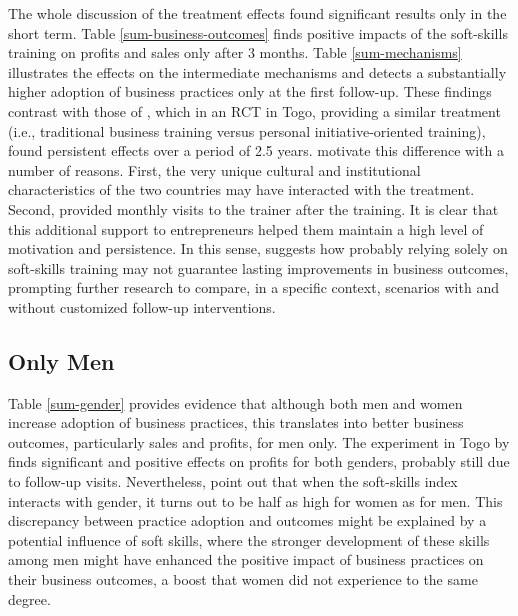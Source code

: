The whole discussion of the treatment effects found significant results only in the short term. Table \ref{sum-business-outcomes} finds positive impacts of the soft-skills training on profits and sales only after 3 months. Table \ref{sum-mechanisms} illustrates the effects on the intermediate mechanisms and detects a substantially higher adoption of business practices only at the first follow-up. These findings contrast with those of \cite{Campos2017}, which in an RCT in Togo, providing a similar treatment (i.e., traditional business training versus personal initiative-oriented training), found persistent effects over a period of 2.5 years. \cite{Ubfal2022} motivate this difference with a number of reasons. First, the very unique cultural and institutional characteristics of the two countries may have interacted with the treatment. Second, \cite{Campos2017} provided monthly visits to the trainer after the training. It is clear that this additional support to entrepreneurs helped them maintain a high level of motivation and persistence. In this sense, \cite{Ubfal2022} suggests how probably relying solely on soft-skills training may not guarantee lasting improvements in business outcomes, prompting further research to compare, in a specific context, scenarios with and without customized follow-up interventions.

\vspace{-5px}

\subsection{Only Men}

Table \ref{sum-gender} provides evidence that although both men and women increase adoption of business practices, this translates into better business outcomes, particularly sales and profits, for men only. The experiment in Togo by \cite{Campos2017} finds significant and positive effects on profits for both genders, probably still due to follow-up visits. Nevertheless, \cite{Ubfal2022} point out that when the soft-skills index interacts with gender, it turns out to be half as high for women as for men. This discrepancy between practice adoption and outcomes might be explained by a potential influence of soft skills, where the stronger development of these skills among men might have enhanced the positive impact of business practices on their business outcomes, a boost that women did not experience to the same degree.

\vspace{-5px}

